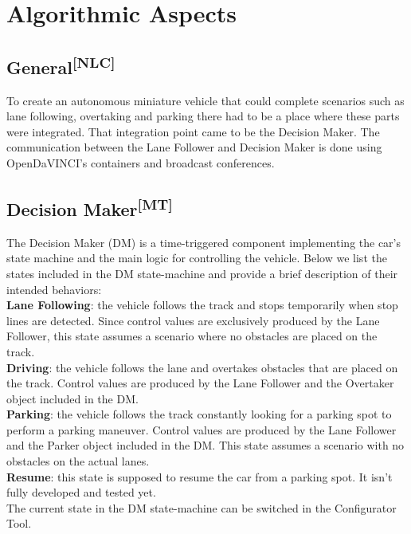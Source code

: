 \chapter{Algorithmic Aspects}
\section[General]{General\textsuperscript{[NLC]}}
To create an autonomous miniature vehicle that could complete scenarios such as
lane following, overtaking and parking there had to be a place where these parts
were integrated. That integration point came to be the Decision Maker. The
communication between the Lane Follower and Decision Maker is done using
OpenDaVINCI's containers and broadcast conferences.

\section[Decision Maker]{Decision Maker\textsuperscript{[MT]}}
The Decision Maker (DM) is a time-triggered component implementing the car's
state machine and the main logic for controlling the vehicle. Below we list the
states included in the DM state-machine and provide a brief description of their
intended behaviors:\\

\noindent
\textbf{Lane Following}: the vehicle follows the track and stops temporarily
when stop lines are detected. Since control values are exclusively produced by
the Lane Follower, this state assumes a scenario where no obstacles are placed
on the track.\\
\textbf{Driving}: the vehicle follows the lane and overtakes obstacles that are
placed on the track. Control values are produced by the Lane Follower and the
Overtaker object included in the DM.\\
\textbf{Parking}: the vehicle follows the track constantly looking for a parking
spot to perform a parking maneuver. Control values are produced by the Lane
Follower and the Parker object included in the DM. This state assumes a scenario
with no obstacles on the actual lanes.\\
\textbf{Resume}: this state is supposed to resume the car from a parking spot.
It isn't fully developed and tested yet.\\
The current state in the DM state-machine can be switched in the Configurator
Tool.\\

